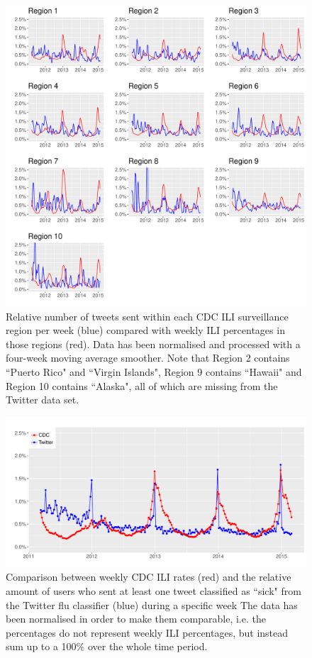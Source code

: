 \documentclass[11pt, a4paper,twoside]{report}\usepackage[]{graphicx}\usepackage[]{color}
\begin{document}
\begin{figure}[htbp!]
\centering
\includegraphics[width=1\linewidth]{29_cdc_twitter_comp_regs_ma4.pdf}
\caption{Relative number of tweets sent within each CDC ILI surveillance region per week (blue) compared with weekly ILI percentages in those regions (red). Data has been normalised and processed with a four-week moving average smoother. Note that Region 2 contains ``Puerto Rico" and ``Virgin Islands", Region 9 contains ``Hawaii" and Region 10 contains ``Alaska", all of which are missing from the Twitter data set.}
\label{fig:cdc_tw_comp_regs_ma4}
\end{figure}

\begin{figure}[htbp!]
  \includegraphics[width=1\linewidth]{30_cdc_twitter_comp_nat_ma1_user.pdf}
  \caption{}
  \caption{Comparison between weekly CDC ILI rates (red) and the relative amount of users who sent at least one tweet classified as ``sick" from the Twitter flu classifier (blue) during a specific week The data has been normalised in order to make them comparable, i.e. the percentages do not represent weekly ILI percentages, but instead sum up to a 100\% over the whole time period.}
    \label{fig:cdc_tw_comp_nat_user_ma1}
\end{figure}
\end{document}
